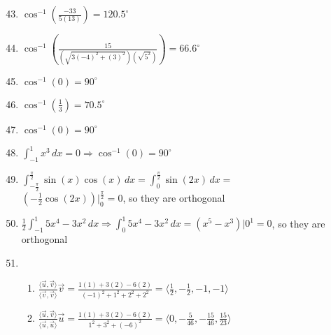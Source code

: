\documentclass[12pt]{article}
\begin{document}
\begin{enumerate}
    \setcounter{enumi}{42}

  \item $\cos^{-1}\left( \frac{-33}{5(13)} \right)=120.5^{\circ}$

    \setcounter{enumi}{44}

  \item $\cos^{-1}\left( \frac{15}{(\sqrt{3(-4)^2+(3)^2})(\sqrt{5^2})} \right)=66.6^{\circ}$

    \setcounter{enumi}{46}

  \item $\cos^{-1}\left( 0 \right)=90^{\circ}$

    \setcounter{enumi}{48}

  \item $\cos^{-1}\left( \frac{1}{3}  \right)=70.5^{\circ}$

  \item $\cos^{-1}\left( 0 \right)=90^{\circ}$

  \item $\int_{-1}^1 x^3\,dx=0\Rightarrow\cos^{-1}\left( 0 \right)=90^{\circ}$

    \setcounter{enumi}{64}

  \item $\int_{-\frac{\pi}{2}}^{\frac{\pi}{2}} \sin(x)\cos(x)\,dx=\int_0^{\frac{\pi}{2}} \sin(2x)\,dx=$\\$\left( -\frac{1}{2}\cos(2x) \right)\Big|_{0}^{\frac{\pi}{2}}=0$, so they are orthogonal

    \setcounter{enumi}{66}

  \item $\frac{1}{2}\int_{-1}^1 5x^4-3x^2\,dx\Rightarrow\int_0^1 5x^4-3x^2\,dx=\left( x^5-x^3 \right)\Big|0^1=0$, so they are orthogonal

    \setcounter{enumi}{74}

  \item

    \begin{enumerate}

      \item $\frac{\langle \overrightarrow{u},\overrightarrow{v}\rangle}{\langle \overrightarrow{v},\overrightarrow{v}\rangle}\overrightarrow{v}=\frac{1(1)+3(2)-6(2)}{(-1)^2+1^2+2^2+2^2}=\langle \frac{1}{2},-\frac{1}{2},-1,-1\rangle$

      \item $\frac{\langle \overrightarrow{u},\overrightarrow{v}\rangle}{\langle \overrightarrow{u},\overrightarrow{u}\rangle}\overrightarrow{u}=\frac{1(1)+3(2)-6(2)}{1^2+3^2+(-6)^2}=\langle 0, -\frac{5}{46}, -\frac{15}{46}, \frac{15}{23}\rangle$


\end{enumerate}
\end{enumerate}
\end{document}
